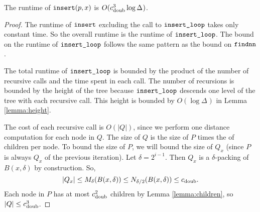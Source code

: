 \documentclass[thesis.tex]{subfiles}
\newcommand{\aspect}[1]{\Delta_{#1}}
\newcommand{\cdoub}{c_\textnormal{doub}}
\newcommand{\mkprocedure}[1]{\textnormal{\ttfamily {#1}}}
\newcommand{\findnn}{\mkprocedure{findnn}}
\newcommand{\ctinsert}{\ensuremath{\textnormal{\ttfamily insert}}}
\newcommand{\ctinsertloop}{\ensuremath{\textnormal{\ttfamily insert\_loop}}}
\begin{document}
\begin{theorem}
    The runtime of $\ctinsert(p,x)$ is $O(\cdoub^3 \log\aspect{})$.
\end{theorem}

\begin{proof}
    The runtime of $\ctinsert$ excluding the call to $\ctinsertloop$ takes only constant time.
    So the overall runtime is the runtime of $\ctinsertloop$.
    The bound on the runtime of $\ctinsertloop$ follows the same pattern as the bound on $\findnn$.

    The total runtime of $\ctinsertloop$ is bounded by the product of the number of recursive calls and the time spent in each call.
    The number of recursions is bounded by the height of the tree because $\ctinsertloop$ descends one level of the tree with each recursive call. 
    This height is bounded by $O(\log\aspect{})$ in Lemma \ref{lemma:height}.

    The cost of each recursive call is $O(|Q|)$,
    since we perform one distance computation for each node in $Q$.
    The size of $Q$ is the size of $P$ times the of children per node.
    To bound the size of $P$, we will bound the size of $Q_x$ 
    (since $P$ is always $Q_x$ of the previous iteration).
    Let $\delta=2^{i-1}$.
    Then $Q_x$ is a $\delta$-packing of $B(x,\delta)$ by construction.
    So,
    \begin{equation}
        |Q_x| \le M_\delta(B(x,\delta)) \le N_{\delta/2}(B(x,\delta)) \le \cdoub.
    \end{equation}
    Each node in $P$ has at most $\cdoub^2$ children by Lemma \ref{lemma:children},
    so $|Q| \le \cdoub^3$.
\end{proof}

\end{document}

